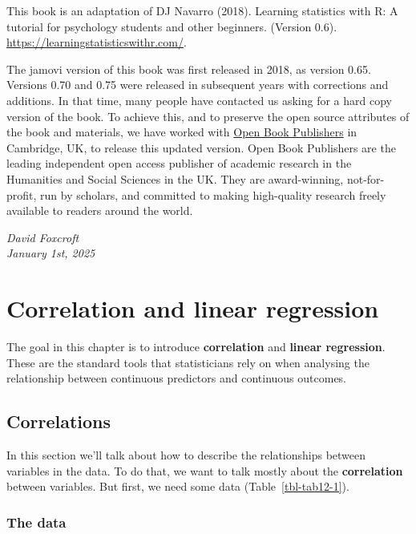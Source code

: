 \documentclass[
  a4paper,
]{book}
\begin{document}

This book is an adaptation of DJ Navarro (2018). Learning statistics
with R: A tutorial for psychology students and other beginners. (Version
0.6). \url{https://learningstatisticswithr.com/}.

The jamovi version of this book was first released in 2018, as version
0.65. Versions 0.70 and 0.75 were released in subsequent years with
corrections and additions. In that time, many people have contacted us
asking for a hard copy version of the book. To achieve this, and to
preserve the open source attributes of the book and materials, we have
worked with
\href{https://www.openbookpublishers.com/books/10.11647/obp.0333}{Open
Book Publishers} in Cambridge, UK, to release this updated version. Open
Book Publishers are the leading independent open access publisher of
academic research in the Humanities and Social Sciences in the UK. They
are award-winning, not-for-profit, run by scholars, and committed to
making high-quality research freely available to readers around the
world.

\emph{David Foxcroft\\
January 1st, 2025}


\hypertarget{sec-Correlation-and-linear-regression}{%
\chapter{Correlation and linear
regression}\label{sec-Correlation-and-linear-regression}}

The goal in this chapter is to introduce \textbf{correlation} and
\textbf{linear regression}. These are the standard tools that
statisticians rely on when analysing the relationship between continuous
predictors and continuous outcomes.

\hypertarget{correlations}{%
\section{Correlations}\label{correlations}}

In this section we'll talk about how to describe the relationships
between variables in the data. To do that, we want to talk mostly about
the \textbf{correlation} between variables. But first, we need some data
(Table~\ref{tbl-tab12-1}).

\hypertarget{the-data}{%
\subsection{The data}\label{the-data}}
\end{document}
